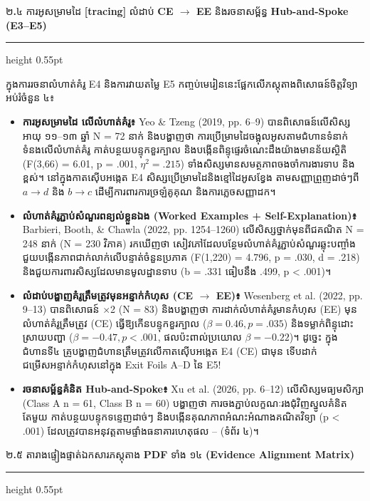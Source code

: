 \documentclass[a4paper,12pt]{article}
\newcommand{\en}[1]{{\TimesEn #1}}
\newcommand{\enbf}[1]{{\TimesEn\textbf{#1}}}
\newcommand{\cnum}[1]{{\TimesEn\fontsize{10.5pt}{12pt}\selectfont\ding{\numexpr181+#1\relax}}}
\newcommand{\subsectitle}[1]{{\muol\fontsize{11.5pt}{16pt}\selectfont #1}}
\newcommand{\subsec}[1]{%
  \Needspace{1.8cm}%
  \vspace{2pt}%
  \subsectitle{#1}\par%
  \vspace{-2pt}%
  {\color{black}\hrule height 0.55pt}%
  \vspace{2pt}%
}
\begin{document}
\subsec{២\enbf{.}៤ ការអូសម្រាមដៃ \enbf{[tracing]} លំដាប់ \enbf{CE $\to$ EE} និងរចនាសម្ព័ន្ធ \enbf{Hub-and-Spoke (E3--E5)}}

ក្នុងការរចនាលំហាត់គំរូ \en{E4} និងការវាយតម្លៃ \en{E5} កញ្ចប់មេរៀននេះផ្អែកលើភស្តុតាងពិសោធន៍ចិត្តវិទ្យាអប់រំចំនួន ៤៖
\begin{itemize}[leftmargin=0.65cm]
  \item \textbf{ការអូសម្រាមដៃ \en{[tracing]} លើលំហាត់គំរូ៖} \en{Yeo \& Tzeng (2019, pp. 6--9)} បានពិសោធន៍លើសិស្សអាយុ ១១--១៣ ឆ្នាំ \en{N = 72} នាក់ និងបង្ហាញថា ការប្រើម្រាមដៃចង្អុលអូសតាមជំហានទំនាក់ទំនងលើលំហាត់គំរូ កាត់បន្ថយបន្ទុកខួរក្បាល និងបង្កើនពិន្ទុផ្ទេរចំណេះដឹងយ៉ាងមានន័យស្ថិតិ (\en{F(3,66) = 6.01, p = .001, $\eta^2 = .215$}) ទាំងសិស្សមានសមត្ថភាពចងចាំការងារទាប និងខ្ពស់។ នៅក្នុងកាតស៊ើបអង្កេត \en{E4} សិស្សប្រើម្រាមដៃនិងខ្មៅដៃអូសខ្វែង \en{[tracing]} តាមសញ្ញាព្រួញដាច់ៗពី $a\to d$ និង $b\to c$ ដើម្បីការពារការច្រឡំគូគុណ និងការភ្លេចសញ្ញាដក។
  \item \textbf{លំហាត់គំរូភ្ជាប់សំណួរពន្យល់ខ្លួនឯង (\en{Worked Examples + Self-Explanation})៖} \en{Barbieri, Booth, \& Chawla (2022, pp. 1254--1260)} លើសិស្សថ្នាក់មុនពីជគណិត \en{N = 248} នាក់ (\en{N = 230} វិភាគ) រកឃើញថា សៀវភៅដែលបន្ថែមលំហាត់គំរូភ្ជាប់សំណួរឆ្លុះបញ្ចាំង ជួយបង្កើនភាពជាក់លាក់លើបន្ទាត់ចំនួនប្រភាគ (\en{F(1,220) = 4.796, p = .030, d = .218}) និងជួយការពារសិស្សដែលមានមូលដ្ឋានទាប (\en{b = .331} ធៀបនឹង \en{.499, p < .001})។
  \item \textbf{លំដាប់បង្ហាញគំរូត្រឹមត្រូវមុនអន្ទាក់កំហុស (\en{CE $\to$ EE})៖} \en{Wesenberg et al. (2022, pp. 9--13)} បានពិសោធន៍ \en{2$\times$2} (\en{N = 83}) និងបង្ហាញថា ការដាក់លំហាត់គំរូមានកំហុស (\en{EE}) មុនលំហាត់គំរូត្រឹមត្រូវ (\en{CE}) ធ្វើឱ្យកើនបន្ទុកខួរក្បាល (\en{$\beta = 0.46, p = .035$}) និងទម្លាក់ពិន្ទុដោះស្រាយបញ្ហា (\en{$\beta = -0.47, p < .001$}, ផលប៉ះពាល់ប្រយោល \en{$\beta = -0.22$})។ ដូច្នេះ ក្នុងជំហានទី៤ គ្រូបង្ហាញជំហានត្រឹមត្រូវលើកាតស៊ើបអង្កេត \en{E4 (CE)} ជាមុន ទើបដាក់ជម្រើសអន្ទាក់កំហុសនៅក្នុង \en{Exit Foils A--D} នៃ \en{E5}!
  \item \textbf{រចនាសម្ព័ន្ធគំនិត \en{Hub-and-Spoke}៖} \en{Xu et al. (2026, pp. 6--12)} លើសិស្សមធ្យមសិក្សា (\en{Class A n = 61, Class B n = 60}) បង្ហាញថា ការចងភ្ជាប់លក្ខណៈរងជុំវិញស្នូលគំនិតតែមួយ កាត់បន្ថយបន្ទុកទន្ទេញដាច់ៗ និងបង្កើនគុណភាពអំណះអំណាងគណិតវិទ្យា (\en{p < .001}) ដែលត្រូវបានអនុវត្តតាមផ្ទាំងធនាគារហេតុផល \cnum{1}--\cnum{5} (ទំព័រ ៤)។
\end{itemize}

\subsec{២\enbf{.}៥ តារាងផ្ទៀងផ្ទាត់ឯកសារភស្តុតាង \enbf{PDF} ទាំង ១៤ \enbf{(Evidence Alignment Matrix)}}
\end{document}

